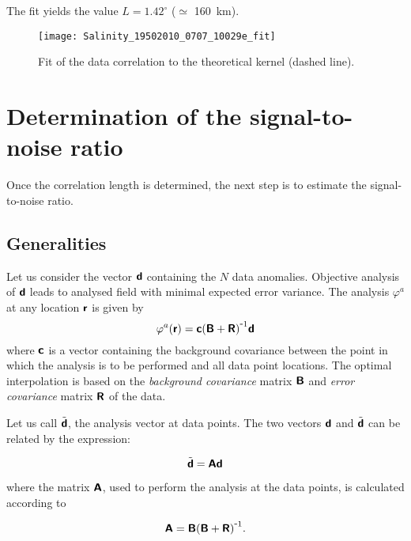The fit yields the value $L=1.42^{\circ}$ ($\simeq$ 160~km).

\begin{figure}[h!]
\centering
\texttt{[image: Salinity\_19502010\_0707\_10029e\_fit]}
\caption{Fit of the data correlation to the theoretical kernel (dashed line). \label{fig:Salinity_19502010_0707_10029e_fit}}
\end{figure}

\section{Determination of the signal-to-noise ratio}

Once the correlation length is determined, the next step is to estimate the signal-to-noise ratio. 

\subsection{Generalities}

Let us consider the vector $\mbox{\boldmath $ \protect\mathsf{d} $}$ containing the $N$ data anomalies. Objective analysis of $\mbox{\boldmath $ \protect\mathsf{d} $}$ leads to analysed field with minimal expected error variance. The analysis $\varphi^a$ at any location $\mbox{\boldmath $ \protect\mathsf{r} $}$ is given by
\begin{equation}
\varphi^a(\mbox{\boldmath $ \protect\mathsf{r} $}) = \mbox{\boldmath $ \protect\mathsf{c} $} {( \mbox{\boldmath $ \protect\mathsf{B} $} + \mbox{\boldmath $ \protect\mathsf{R} $} )}^{ \mbox{\small{-}} 1} \mbox{\boldmath $ \protect\mathsf{d} $}
\end{equation}
where $\mbox{\boldmath $ \protect\mathsf{c} $}$ is a vector containing the background covariance between the point in which the analysis is to be performed and all data point locations. The optimal interpolation is based on the \textit{background covariance} matrix $\mbox{\boldmath $ \protect\mathsf{B} $}$ and \textit{error covariance} matrix $\mbox{\boldmath $ \protect\mathsf{R} $}$ of the data.
 
Let us call $\tilde{\mbox{\boldmath $ \protect\mathsf{d} $}}$, the analysis vector at data points. The two vectors ${\mbox{\boldmath $ \protect\mathsf{d} $}}$ and $\tilde{\mbox{\boldmath $ \protect\mathsf{d} $}}$ can be related by the expression:

\begin{equation}
\tilde{\mbox{\boldmath $ \protect\mathsf{d} $}}  =  \mbox{\boldmath $ \protect\mathsf{A} $} \mbox{\boldmath $ \protect\mathsf{d} $}
\end{equation}

where the matrix $\mbox{\boldmath $ \protect\mathsf{A} $}$, used to perform the analysis at the data points, is calculated according to 

\begin{equation}
\mbox{\boldmath $ \protect\mathsf{A} $}=\mbox{\boldmath $ \protect\mathsf{B} $} {( \mbox{\boldmath $ \protect\mathsf{B} $} + \mbox{\boldmath $ \protect\mathsf{R} $} )}^{ \mbox{\small{-}} 1}.
\end{equation}

